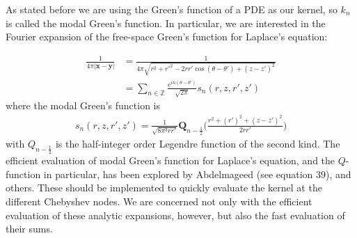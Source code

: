 \documentclass[11pt, oneside]{article}   	%
\begin{document}

As stated before we are using the Green's function of a PDE as our kernel, so $k_n$ is called the modal Green's function. In particular, we are interested in the Fourier expansion of the free-space Green's function for Laplace's equation:

\begin{align}
\frac{1}{4\pi |\mathbf{x}-\mathbf{y}|} &=\frac{1}{4\pi\sqrt{r^2+r'^2-2rr'\cos{(\theta-\theta')}+(z-z')^2}}\\
&= \sum_{n\in\mathbb{Z}} \frac{e^{in(\theta-\theta')}}{\sqrt{2\pi}} s_n(r,z,r',z')
\end{align}
where the modal Green's function is
\begin{align}
s_n(r,z,r',z')=\frac{1}{\sqrt{8\pi^3 rr'}}\mathbf{Q}_{n-\frac{1}{2}}\bigg(\frac{r^2+(r')^2+(z-z')^2}{2rr'}\bigg)
\end{align}
with $Q_{n-\frac{1}{2}}$ is the half-integer order Legendre function of the second kind. The efficient evaluation of modal Green's function for Laplace's equation, and the $Q$-function in particular, has been explored by Abdelmageed (see equation $39$), and others. These should be implemented to quickly evaluate the kernel at the different Chebyshev nodes. We are concerned not only with the efficient evaluation of these analytic expansions, however, but also the fast evaluation of their sums.
\end{document}
